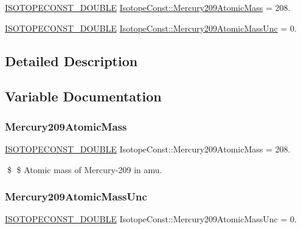 \begin{DoxyCompactItemize}
\item 
\mbox{\hyperlink{group___isotope_const-_macros_ga8f45a7272ce02c0b4c65c44636ed719a}{I\+S\+O\+T\+O\+P\+E\+C\+O\+N\+S\+T\+\_\+\+D\+O\+U\+B\+LE}} \mbox{\hyperlink{group___isotope_const-_mercury-_hg209_ga00947be8673370b8ac2d506b27d9ae33}{Isotope\+Const\+::\+Mercury209\+Atomic\+Mass}} = 208.
\item 
\mbox{\hyperlink{group___isotope_const-_macros_ga8f45a7272ce02c0b4c65c44636ed719a}{I\+S\+O\+T\+O\+P\+E\+C\+O\+N\+S\+T\+\_\+\+D\+O\+U\+B\+LE}} \mbox{\hyperlink{group___isotope_const-_mercury-_hg209_ga4432d0f4636e2b16c3ee9e054ccf1017}{Isotope\+Const\+::\+Mercury209\+Atomic\+Mass\+Unc}} = 0.
\end{DoxyCompactItemize}


\subsection{Detailed Description}


\subsection{Variable Documentation}
\mbox{\label{group___isotope_const-_mercury-_hg209_ga00947be8673370b8ac2d506b27d9ae33}} 
\subsubsection{\texorpdfstring{Mercury209\+Atomic\+Mass}{Mercury209AtomicMass}}
{\footnotesize\ttfamily \mbox{\hyperlink{group___isotope_const-_macros_ga8f45a7272ce02c0b4c65c44636ed719a}{I\+S\+O\+T\+O\+P\+E\+C\+O\+N\+S\+T\+\_\+\+D\+O\+U\+B\+LE}} Isotope\+Const\+::\+Mercury209\+Atomic\+Mass = 208.}

\$ \$ Atomic mass of Mercury-\/209 in amu. \mbox{\label{group___isotope_const-_mercury-_hg209_ga4432d0f4636e2b16c3ee9e054ccf1017}} 
\subsubsection{\texorpdfstring{Mercury209\+Atomic\+Mass\+Unc}{Mercury209AtomicMassUnc}}
{\footnotesize\ttfamily \mbox{\hyperlink{group___isotope_const-_macros_ga8f45a7272ce02c0b4c65c44636ed719a}{I\+S\+O\+T\+O\+P\+E\+C\+O\+N\+S\+T\+\_\+\+D\+O\+U\+B\+LE}} Isotope\+Const\+::\+Mercury209\+Atomic\+Mass\+Unc = 0.}

